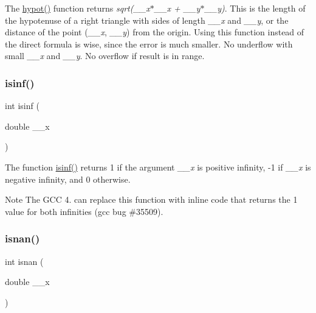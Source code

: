 The \hyperlink{group__avr__math_gacb9c5b29c1ee2aed4d0f2d412a12f777}{hypot()} function returns {\itshape sqrt(\+\_\+\+\_\+x$\ast$\+\_\+\+\_\+x + \+\_\+\+\_\+y$\ast$\+\_\+\+\_\+y)}. This is the length of the hypotenuse of a right triangle with sides of length {\itshape \+\_\+\+\_\+x} and {\itshape \+\_\+\+\_\+y}, or the distance of the point ({\itshape \+\_\+\+\_\+x}, {\itshape \+\_\+\+\_\+y}) from the origin. Using this function instead of the direct formula is wise, since the error is much smaller. No underflow with small {\itshape \+\_\+\+\_\+x} and {\itshape \+\_\+\+\_\+y}. No overflow if result is in range. \mbox{\label{group__avr__math_ga7958c6f2498eaf51798f80de9fcfe9d0}} 
\subsubsection{\texorpdfstring{isinf()}{isinf()}}
{\footnotesize\ttfamily int isinf (\begin{DoxyParamCaption}\item[{double}]{\+\_\+\+\_\+x }\end{DoxyParamCaption})}

The function \hyperlink{group__avr__math_ga7958c6f2498eaf51798f80de9fcfe9d0}{isinf()} returns 1 if the argument {\itshape \+\_\+\+\_\+x} is positive infinity, -\/1 if {\itshape \+\_\+\+\_\+x} is negative infinity, and 0 otherwise.

\begin{DoxyNote}{Note}
The G\+CC 4. can replace this function with inline code that returns the 1 value for both infinities (gcc bug \#35509). 
\end{DoxyNote}
\mbox{\label{group__avr__math_gafa5b3d99af3bf027f5742e5c0e6b7095}} 
\subsubsection{\texorpdfstring{isnan()}{isnan()}}
{\footnotesize\ttfamily int isnan (\begin{DoxyParamCaption}\item[{double}]{\+\_\+\+\_\+x }\end{DoxyParamCaption})}

